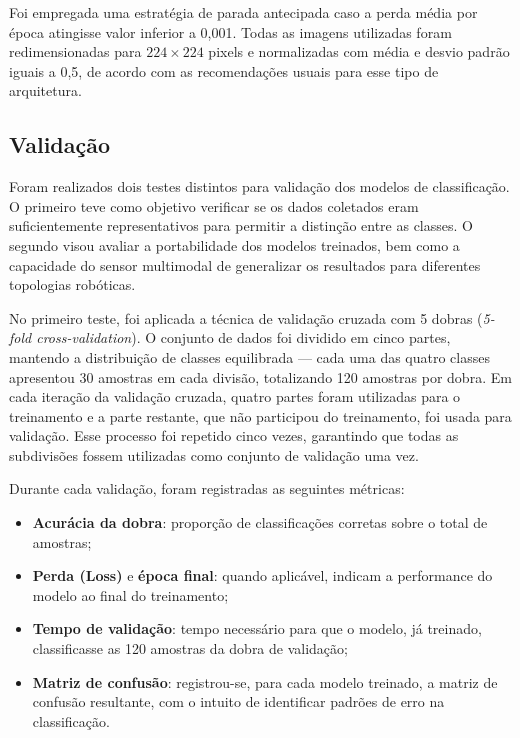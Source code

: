 Foi empregada uma estratégia de parada antecipada caso a perda média por época atingisse valor inferior a 0{,}001. Todas as imagens utilizadas foram redimensionadas para $224 \times 224$ pixels e normalizadas com média e desvio padrão iguais a 0{,}5, de acordo com as recomendações usuais para esse tipo de arquitetura.

\subsection{Validação}

Foram realizados dois testes distintos para validação dos modelos de classificação. O primeiro teve como objetivo verificar se os dados coletados eram suficientemente representativos para permitir a distinção entre as classes. O segundo visou avaliar a portabilidade dos modelos treinados, bem como a capacidade do sensor multimodal de generalizar os resultados para diferentes topologias robóticas.

No primeiro teste, foi aplicada a técnica de validação cruzada com 5 dobras (\textit{5-fold cross-validation}). O conjunto de dados foi dividido em cinco partes, mantendo a distribuição de classes equilibrada — cada uma das quatro classes apresentou 30 amostras em cada divisão, totalizando 120 amostras por dobra. Em cada iteração da validação cruzada, quatro partes foram utilizadas para o treinamento e a parte restante, que não participou do treinamento, foi usada para validação. Esse processo foi repetido cinco vezes, garantindo que todas as subdivisões fossem utilizadas como conjunto de validação uma vez.

Durante cada validação, foram registradas as seguintes métricas:
\begin{itemize}
    \item \textbf{Acurácia da dobra}: proporção de classificações corretas sobre o total de amostras;
    \item \textbf{Perda (Loss)} e \textbf{época final}: quando aplicável, indicam a performance do modelo ao final do treinamento;
    \item \textbf{Tempo de validação}: tempo necessário para que o modelo, já treinado, classificasse as 120 amostras da dobra de validação;
    \item \textbf{Matriz de confusão}: registrou-se, para cada modelo treinado, a matriz de confusão resultante, com o intuito de identificar padrões de erro na classificação.
\end{itemize}

